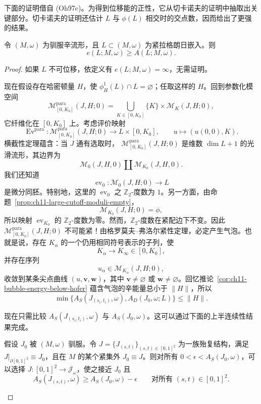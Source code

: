 下面的证明借自 (Oh97c)。为得到位移能的正性，它从切卡诺夫的证明中抽取出关键部分。切卡诺夫的证明还估计 $L$ 与 $\phi(L)$ 相交时的交点数，因而给出了更强的结果。

\begin{theorem}[切卡诺夫]\label{thm:ch11-chekanov-displacement-energy}
令 $(M,\omega)$ 为驯服辛流形，且
$L\subset(M,\omega)$ 为紧拉格朗日嵌入。则
\[
 e(L;M,\omega)\geq A(L;M,\omega).
\]
\end{theorem}

\begin{proof}
如果 $L$ 不可位移，依定义有 $e(L;M,\omega)=\infty$，无需证明。

现在假设存在哈密顿量 $H$，使 $\phi_H^1(L)\cap L=\varnothing$；任取这样的 $H$。回到参数化模空间
\[
 \mathcal M_{[0,K_0]}^{\mathrm{para}}(J,H;0)
 =\bigcup_{K\in[0,K_0]}\{K\}\times\mathcal M_K(J,H;0),
\]
它纤维化在 $[0,K_0]$ 上。考虑评价映射
\[
 \operatorname{Ev}^{\mathrm{para}}:
 \mathcal M_{[0,K_0]}^{\mathrm{para}}(J,H;0)
 \longrightarrow L\times[0,K_0],
 \qquad u\longmapsto(u(0,0),K).
\]
横截性定理蕴含：当 $J$ 通有选取时，
$\mathcal M_{[0,K_0]}^{\mathrm{para}}(J,H;0)$ 是维数
$\dim L+1$ 的光滑流形，其边界为
\[
 \mathcal M_0(J,H,0)\amalg
 \mathcal M_{K_0}(J,H,0).
\]
我们还知道
\[
 \operatorname{ev}_0:\mathcal M_0(J,H;0)\longrightarrow L
\]
是微分同胚。特别地，这里的 $\operatorname{ev}_0$ 之 $\mathbb Z_2$-度数为 $1$。另一方面，由命题~\ref{prop:ch11-large-cutoff-moduli-empty}，
\[
 \mathcal M_{K_0}(J,H;0)=\phi,
\]
所以映射 $\operatorname{ev}_{K_0}$ 的 $\mathbb Z_2$-度数为零。然而，$\mathbb Z_2$-度数在紧配边下不变。因此
$\mathcal M_{[0,K_0]}^{\mathrm{para}}(J,H;0)$ 不可能紧！由格罗莫夫--弗洛尔紧性定理，必定产生气泡。也就是说，存在 $K_\alpha$ 的一个仍用相同符号表示的子列，使
\[
 K_\alpha\longrightarrow K_\infty\in[0,K_0],
\]
并存在序列
\[
 u_\alpha\in\mathcal M_{K_\alpha}(J,H;0),
\]
收敛到某条尖点曲线 $(u,\mathbf v,\mathbf w)$，其中
$\mathbf v\ne\varnothing$ 或 $\mathbf w\ne\varnothing$。回忆推论~\ref{cor:ch11-bubble-energy-below-hofer} 蕴含气泡的辛能量总小于
$\lVert H\rVert$，所以
\[
 \min\{A_S(J_{(s_i,t_i)},\omega),A_D(J_0,\omega;L)\}
 \leq\lVert H\rVert.
\]

现在只需比较 $A_S(J_{(s_i,t_i)},\omega)$ 与 $A_S(J_0,\omega)$。这可以通过下面的上半连续性结果完成。

\begin{proposition}\label{prop:ch11-upper-semicontinuity-sphere-area}
假设 $J_0$ 被 $(M,\omega)$ 驯服。令
$J=\{J_{(s,t)}\}_{(s,t)\in[0,1]^2}$ 为一族殆复结构，满足
$J|_{\partial[0,1]^2}\equiv J_0$，且在 $M$ 的某个紧集外
$J_0\equiv J$。则对所有
$0<\epsilon<A_S(J_0,\omega)$，可以选择
$J:[0,1]^2\to\mathcal J_\omega$，使之接近 $J_0$ 且
\[
 A_S(J_{(s,t)},\omega)
 \geq A_S(J_0,\omega)-\epsilon
 \qquad\text{对所有 }(s,t)\in[0,1]^2.
\]
\end{proposition}


\end{proof}
